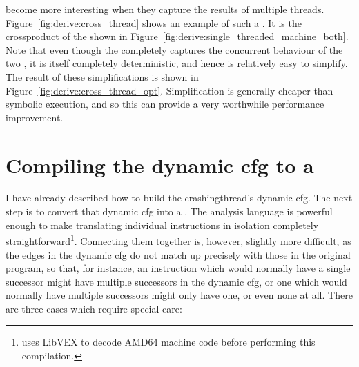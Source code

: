 {\STateMachines} become more interesting when they capture the results
of multiple threads.  Figure~\ref{fig:derive:cross_thread} shows an
example of such a {\StateMachine}.  It is the \gls{crossproduct} of
the {\StateMachines} shown in
Figure~\ref{fig:derive:single_threaded_machine_both}.  Note that even
though the {\StateMachine} completely captures the concurrent
behaviour of the two {\StateMachines}, it is itself completely
deterministic, and hence is relatively easy to simplify.  The result
of these simplifications is shown in
Figure~\ref{fig:derive:cross_thread_opt}.  Simplification is generally
cheaper than symbolic execution, and so this can provide a very
worthwhile performance improvement.

\section[Compiling the dynamic \glsentrytext{cfg} to a \StateMachine]{Compiling the dynamic \gls{cfg} to a \StateMachine}
\label{sect:derive:compile_cfg}

I have already described how to build the \gls{crashingthread}'s
dynamic \gls{cfg}.  The next step is to convert that dynamic \gls{cfg}
into a {\StateMachine}.  The {\StateMachine} analysis language is
powerful enough to make translating individual instructions in
isolation completely straightforward\footnote{{\Implementation} uses
  LibVEX  to decode AMD64 machine code before performing
  this compilation.}.  Connecting them together is, however, slightly
more difficult, as the edges in the dynamic \gls{cfg} do not match up
precisely with those in the original program, so that, for instance,
an instruction which would normally have a single successor might have
multiple successors in the dynamic \gls{cfg}, or one which would
normally have multiple successors might only have one, or even none at
all.  There are three cases which require special care:

